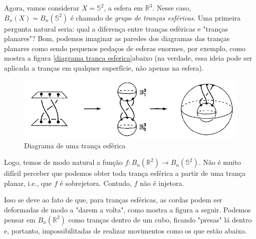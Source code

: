 \documentclass[a4paper,portuguese,11pt,twoside, leqno]{book}
\theoremstyle{definition}
\begin{document}
	\par\vspace{0.3cm} Agora, vamos considerar $X = \mathbb{S}^2$, a esfera em $\mathbb{R}^3$. Nesse caso, $B_n(X) = B_n(\mathbb{S}^2)$ é chamado de \textit{grupo de tranças esféricas}. Uma primeira pergunta natural seria: qual a diferença entre tranças esféricas e "tranças planares"? Bom, podemos imaginar as paredes dos diagramas das tranças planares como sendo pequenos pedaços de esferas enormes, por exemplo, como mostra a figura \eqref{diagrama tranca esferica}abaixo (na verdade, essa ideia pode ser aplicada a tranças em qualquer superfície, não apenas na esfera).
	
	\begin{figure}[H]
		\begin{center}
			\includegraphics[width=12cm]{Images/diagrama_tranca_esferica.png}
		\end{center}\caption{Diagrama de uma trança esférica}
		\label{diagrama tranca esferica}
	\end{figure}
	\par\vspace{0.3cm} Logo, temos de modo natural a função $f: B_n(\mathbb{R}^2)\to B_n(\mathbb{S}^2)$. Não é muito difícil perceber que podemos obter toda trança esférica a partir de uma trança planar, i.e., que $f$ é sobrejetora. Contudo, $f$ não é injetora.
	\par\vspace{0.3cm} Isso se deve ao fato de que, para tranças esféricas, as cordas podem ser deformadas de modo a "darem a volta", como mostra a figura a seguir. Podemos pensar em $B_n(\mathbb{R}^2)$ como tranças dentro de um cubo, ficando "presas" lá dentro e, portanto, impossibilitadas de realizar movimentos como os que estão abaixo.
	
\end{document}
